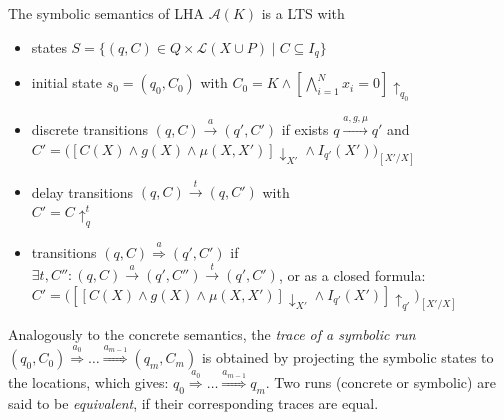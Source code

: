 \documentclass{llncs}
\newcommand{\A}{\ensuremath{\mathcal{A}}}
\newcommand{\trans}[1]{\ensuremath{\overset{#1}{\rightarrow}}}
\newcommand{\Trans}[1]{\ensuremath{\overset{#1}{\Rightarrow}}}
\newcommand{\project}[1]{\ensuremath{\downarrow_{#1}}}
\newcommand{\telapse}{\ensuremath{\uparrow}}
\begin{document}
\begin{definition}\label{def:ssem}
  The symbolic semantics of LHA $\A(K)$ is a LTS with
  \begin{itemize}
  \item states $S = \{ (q,C) \in Q \times \mathcal{L}(X \cup P) \mid C \subseteq I_q \}$
  \item initial state $s_0 = (q_0, C_0)$ with $C_0 =  K \wedge [\bigwedge_{i=1}^N x_i=0] \telapse_{q_0}$
  \item discrete transitions $(q,C) \trans{a} (q',C')$ if exists $q \trans{a,g,\mu} q'$ and \\
    $C' = \big( \left[ C(X) \wedge g(X) \wedge \mu(X,X') \right]
    \project{X'} \wedge I_{q'}(X') \big)_{[X'/X]}$
  \item delay transitions $(q,C) \trans{t} (q,C')$ with \\
    $C' = C \telapse_q^t$
  \item transitions $(q,C) \overset{a}{\Rightarrow} (q',C')$ if \\
    $\exists t,C'': (q,C) \trans{a} (q',C'') \trans{t} (q',C')$, or as a closed formula:\\
    $C' = \big( \left[ \left[ C(X) \wedge g(X) \wedge \mu(X,X') \right] \project{X'} \wedge I_{q'}(X') \right] \telapse_{q'} \big)_{[X'/X]}$
  \end{itemize}
\end{definition}



Analogously to the concrete semantics, the {\em trace of a symbolic run}
$(q_0, C_0) \Trans{a_0} \dots \Trans{a_{m-1}} (q_m, C_m)$ is obtained
by projecting the symbolic states to the locations,
which gives: $q_0
\Trans{a_0} \dots \Trans{a_{m-1}} q_m$. Two runs (concrete or
symbolic) are said to be {\em equivalent}, if their corresponding traces are
equal.
\end{document}
